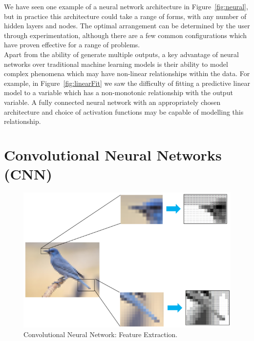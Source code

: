 \noindent
We have seen one example of a neural network architecture in Figure~\ref{fig:neural}, but in practice this architecture could take a range of forms, with any number of hidden layers and nodes. The optimal arrangement can be determined by the user through experimentation, although there are a few common configurations which have proven effective for a range of problems. \\

\noindent
Apart from the ability of generate multiple outputs, a key advantage of neural networks over traditional machine learning models is their ability to model complex phenomena which may have non-linear relationships within the data. For example, in Figure~\ref{fig:linearFit} we saw the difficulty of fitting a predictive linear model to a variable which has a  non-monotonic relationship with the output variable. A fully connected neural network with an appropriately chosen architecture and choice of activation functions may be capable of modelling this relationship. \\ 




\section{Convolutional Neural Networks (CNN)} \label{convolution}

\begin{figure}[p]
	\centering
	\includegraphics[scale=0.75]{Figures/cnn_feature.png}
	\caption{Convolutional Neural Network: Feature Extraction.}
	\label{fig:cnn_feature}
\end{figure}

